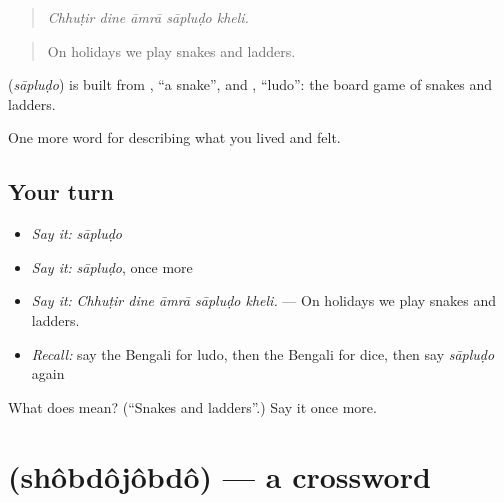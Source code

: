 \begin{quote}
    
\end{quote}

\begin{quote}
\emph{Chhuṭir dine āmrā sāpluḍo kheli.}
\end{quote}

\begin{quote}
On holidays we play snakes and ladders.
\end{quote}

\begin{cousinweb}
\textbf{} (\emph{sāpluḍo}) is built from , \textquotedblleft{}a snake\textquotedblright{}, and , \textquotedblleft{}ludo\textquotedblright{}: the board game of snakes and ladders.
\end{cousinweb}

\begin{grammarlens}[title={What you've built}]
One more word for describing what you lived and felt.
\end{grammarlens}

\subsection*{Your turn}
\begin{itemize}
\raggedright
  \item \emph{Say it:} \emph{sāpluḍo}
  \item \emph{Say it:} \emph{sāpluḍo}, once more
  \item \emph{Say it:} \emph{Chhuṭir dine āmrā sāpluḍo kheli.} — On holidays we play snakes and ladders.
  \item \emph{Recall:} say the Bengali for ludo, then the Bengali for dice, then say \emph{sāpluḍo} again
\end{itemize}

\begin{tcolorbox}[breakable,colback=teal!4,colframe=teal!35!black,title={Before you move on}]
What does  mean? (\textquotedblleft{}Snakes and ladders\textquotedblright{}.) Say it once more.
\end{tcolorbox}
\section[\texorpdfstring{\bn{শব্দজব্দ} (shôbdôjôbdô)}{শব্দজব্দ (shôbdôjôbdô)}]{ (shôbdôjôbdô) — a crossword}

